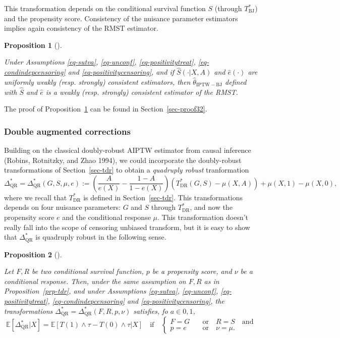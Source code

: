 \documentclass[
  11pt,
  a4paper,
]{article}
\theoremstyle{plain}
\theoremstyle{plain}
\theoremstyle{plain}
\newtheorem{proposition}{Proposition}[section]
\theoremstyle{definition}
\theoremstyle{remark}
\begin{document}
This transformation depends on the conditional survival function \(S\)
(through \(T^*_{\mathrm{BJ}}\)) and the propensity score. Consistency of
the nuisance parameter estimators implies again consistency of the RMST
estimator.

\begin{proposition}[]\protect\hypertarget{prp-consiptwbj}{}\label{prp-consiptwbj}

Under Assumptions
\ref{eq-sutva}, \ref{eq-unconf}, \ref{eq-positivitytreat}, \ref{eq-condindepcensoring}
and \ref{eq-positivitycensoring}, and if \(\widehat S(\cdot|X,A)\) and
\(\widehat e (\cdot)\) are uniformly weakly (resp. strongly) consistent
estimators, then \(\widehat\theta_{\mathrm{IPTW-BJ}}\) defined with
\(\widehat S\) and \(\widehat e\) is a weakly (resp. strongly)
consistent estimator of the RMST.

\end{proposition}

The proof of Proposition~\ref{prp-consiptwbj} can be found in
Section~\ref{sec-proof32}.

\subsubsection{Double augmented corrections}\label{sec-AIPTW_AIPCW}

Building on the classical doubly-robust AIPTW estimator from causal
inference (Robins, Rotnitzky, and Zhao 1994), we could incorporate the
doubly-robust transformations of Section~\ref{sec-tdr} to obtain a
\emph{quadruply robust} tranformation \[
\Delta^*_{\mathrm{QR}} = \Delta^*_{\mathrm{QR}}(G,S,\mu,e)  := \left(\frac{A}{e(X)}-\frac{1-A}{1-e(X)}\right)(T^*_{\mathrm{DR}}(G,S)-\mu(X,A))+\mu(X,1)-\mu(X,0),
\] where we recall that \(T^*_{\mathrm{DR}}\) is defined in
Section~\ref{sec-tdr}. This transformations depends on four nuisance
parameters: \(G\) and \(S\) through \(T^*_{\mathrm{DR}}\), and now the
propensity score \(e\) and the conditional response \(\mu\). This
transformation doesn't really fall into the scope of censoring unbiased
transform, but it is easy to show that \(\Delta^*_{\mathrm{QR}}\) is
quadruply robust in the following sense.

\begin{proposition}[]\protect\hypertarget{prp-tqr}{}\label{prp-tqr}

Let \(F,R\) be two conditional survival function, \(p\) be a propensity
score, and \(\nu\) be a conditional response. Then, under the same
assumption on \(F,R\) as in Proposition~\ref{prp-tdr}, and under
Assumptions
\ref{eq-sutva}, \ref{eq-unconf}, \ref{eq-positivitytreat}, \ref{eq-condindepcensoring}
and \ref{eq-positivitycensoring}, the transformations
\(\Delta^*_{\mathrm{QR}} = \Delta^*_{\mathrm{QR}}(F,R,p,\nu)\)
satisfies, fo \(a \in {0,1}\), \[
\mathbb{E}[ \Delta^*_\mathrm{QR} |X] = \mathbb{E}[T(1)\wedge \tau-T(0)\wedge \tau |X]\quad\text{if}\quad  
\begin{cases} F = G \quad &\text{or}\quad R=S \quad \text{and} \\
p=e \quad &\text{or}\quad \nu=\mu.
\end{cases}
\]

\end{proposition}
\end{document}
